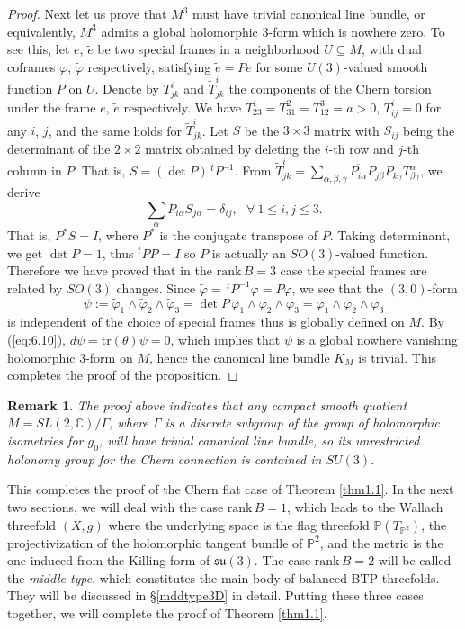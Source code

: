 \documentclass{amsart}
\numberwithin{equation}{section}
\newtheorem{remark}  [theorem]     {Remark}
\theoremstyle{definition}
\renewcommand{\1}{\mathds{1}}
\renewcommand{\>}{\rightarrow}
\begin{document}
\begin{proof}
Next let us prove that $M^3$ must have trivial canonical line bundle, or equivalently, $M^3$ admits a global holomorphic $3$-form which is nowhere zero. To see this, let $e$, $\tilde{e}$ be two special frames in a neighborhood $U\subseteq M$, with dual coframes $\varphi$, $\tilde{\varphi}$ respectively, satisfying $\tilde{e}=Pe$ for some $U(3)$-valued smooth function $P$ on $U$. Denote by $T^i_{jk}$ and $\tilde{T}^i_{jk}$ the components of the Chern torsion under the frame $e$, $\tilde{e}$ respectively. We have $T^1_{23}=T^2_{31}=T^3_{12}=a>0$, $T^i_{ij}=0$ for any $i$, $j$, and the same holds for $\tilde{T}^i_{jk}$. Let $S$ be the $3\times 3$ matrix with $S_{ij}$ being the determinant of the $2\times 2$ matrix obtained by deleting the $i$-th row and $j$-th column in $P$. That is,  $S=(\det P) \,^t\!P^{-1}$. From $\tilde{T}^i_{jk} = \sum_{\alpha, \beta ,\gamma } \overline{P_{i\alpha }} P_{j\beta } P_{k \gamma } T^{\alpha}_{\beta \gamma }$, we derive
$$ \sum_{\alpha} \overline{P_{i\alpha }}S_{j \alpha } = \delta_{ij}, \ \ \ \forall \ 1\leq i,j\leq 3. $$
That is, $P^{\ast}S=I$, where $P^{\ast}$ is the conjugate transpose of $P$. Taking determinant, we get $\det P=1$, thus $^t\!P P=I$ so $P$ is actually an $SO(3)$-valued function. Therefore we have proved that in the $\mbox{rank}\,B=3$ case the special frames are related by $SO(3)$ changes. Since $\tilde{\varphi}=\,^t\!P^{-1}\varphi = P\varphi$, we see that the $(3,0)$-form
$$\psi := \tilde{\varphi}_1 \wedge \tilde{\varphi}_2\wedge \tilde{\varphi}_3 = \det P \,\varphi_1\wedge \varphi_2 \wedge \varphi_3= \varphi_1\wedge \varphi_2 \wedge \varphi_3$$
is independent of the choice of special frames thus is globally defined on $M$. By (\ref{eq:6.10}), $d\psi=\mbox{tr}(\theta) \psi =0$, which implies that $\psi$ is a global nowhere vanishing holomorphic $3$-form on $M$, hence the canonical line bundle $K_{\!M}$ is trivial. This completes the proof of the proposition.
\end{proof}

\begin{remark}
The proof above indicates that any compact smooth quotient $M=SL(2,{\mathbb C})/\Gamma $, where $\Gamma$ is a discrete subgroup of the group of holomorphic isometries for $g_0$, will have trivial canonical line bundle, so its unrestricted holonomy group for the  Chern connection is contained in $SU(3)$.
\end{remark}

This completes the proof of the  Chern flat case of Theorem \ref{thm1.1}. In the next two sections, we  will  deal with the case $\mathrm{rank}\,B=1$, which leads to the Wallach threefold $(X,g)$ where the underlying space is the flag threefold $\mathbb{P}(T_{\mathbb{P}^2})$, the projectivization of the holomorphic tangent bundle of ${\mathbb P}^2$, and the metric is the one induced from the Killing form of
${\mathfrak s}{\mathfrak u}(3)$. The case $\mathrm{rank}\,B=2$ will be called the {\em middle type}, which constitutes the main body of balanced BTP threefolds. They will be discussed in \S \ref{mddtype3D} in detail. Putting these three cases together, we will complete the proof of Theorem \ref{thm1.1}.
\end{document}
